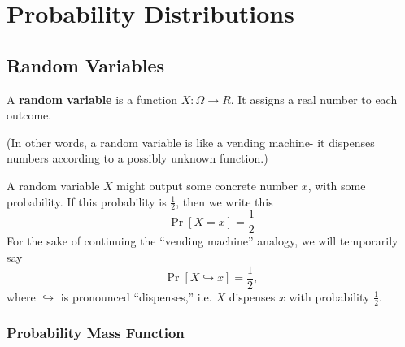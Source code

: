 \documentclass[../main.tex]{subfiles}
\begin{document}
\chapter{Probability Distributions}
\section{Random Variables}
\begin{definition}
A \textbf{random variable} is a function $X : \Omega \rightarrow R$. It assigns a real number to each outcome. 
\end{definition}
(In other words, a random variable is like a vending machine- it dispenses numbers according to a possibly unknown function.)

A random variable $X$ might output some concrete number $x$, with some probability. If this probability is $\frac 12$, then we write this
\[
	\Pr[X = x] = \frac 12
\]
For the sake of continuing the ``vending machine'' analogy, we will temporarily say \[\Pr[X \hookrightarrow x] = \frac 12,\] where $\hookrightarrow$ is pronounced ``dispenses,'' i.e. $X$ dispenses $x$ with probability $\frac 12$. 

\subsection{Probability Mass Function}
\end{document}
